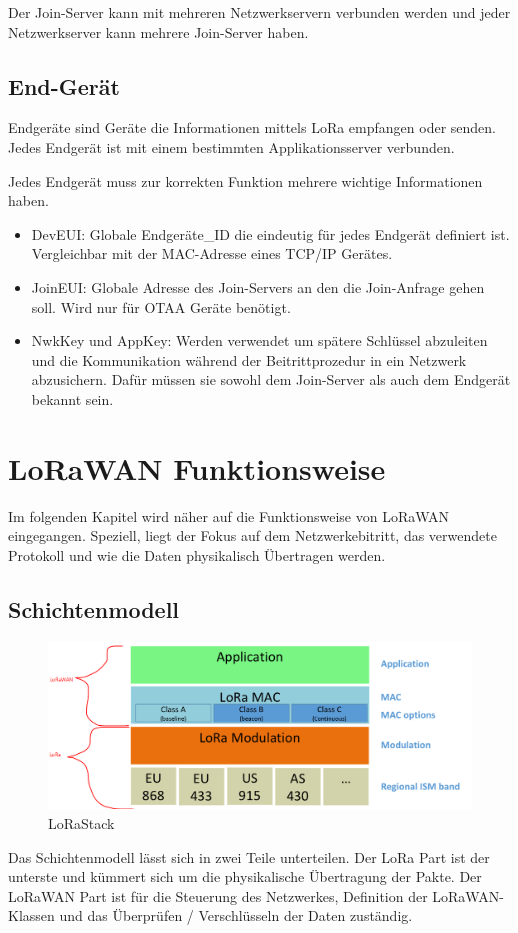 \documentclass[a4paper,12pt]{article}
\begin{document}
            Der Join-Server kann mit mehreren Netzwerkservern verbunden werden und jeder Netzwerkserver kann mehrere 
            Join-Server haben.
        \subsection{End-Gerät}\label{sec:endgerät}
            Endgeräte sind Geräte die Informationen mittels LoRa empfangen oder senden. Jedes Endgerät ist mit einem 
            bestimmten Applikationsserver verbunden.

            Jedes Endgerät muss zur korrekten Funktion mehrere wichtige Informationen haben.
            \begin{itemize}
                \item DevEUI: Globale Endgeräte\_ID die eindeutig für jedes Endgerät definiert ist. Vergleichbar 
                mit der MAC-Adresse eines TCP/IP Gerätes.
                \item JoinEUI: Globale Adresse des Join-Servers an den die Join-Anfrage gehen soll. Wird nur für OTAA Geräte
                benötigt.
                \item NwkKey und AppKey: Werden verwendet um spätere Schlüssel abzuleiten und die Kommunikation während
                der Beitrittprozedur in ein Netzwerk abzusichern. Dafür müssen sie sowohl dem Join-Server als auch dem
                Endgerät bekannt sein.
            \end{itemize}
            \cite[S.47 ff.]{LoRaSpec}

    \section{LoRaWAN Funktionsweise}
        Im folgenden Kapitel wird näher auf die Funktionsweise von LoRaWAN eingegangen. Speziell, liegt der Fokus auf
        dem Netzwerkebitritt, das verwendete Protokoll und wie die Daten physikalisch Übertragen werden.
        \subsection{Schichtenmodell}
            \begin{figure}
                \includegraphics[width=\textwidth]{LoraLayer}
                \caption{LoRaStack \cite[S.7]{WhatIsLoRa}}
            \end{figure}
            Das Schichtenmodell lässt sich in zwei Teile unterteilen. Der LoRa Part ist der unterste und kümmert sich 
            um die physikalische Übertragung der Pakte. Der LoRaWAN Part ist für die Steuerung des 
            Netzwerkes, Definition der LoRaWAN-Klassen und das Überprüfen / Verschlüsseln der Daten zuständig.
\end{document}
